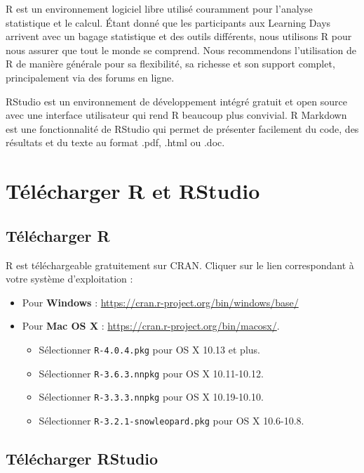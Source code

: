 \documentclass[
  12pt,
]{book}
\providecommand{\tightlist}{%
  \setlength{\itemsep}{0pt}\setlength{\parskip}{0pt}}
\begin{document}
R est un environnement logiciel libre utilisé couramment pour l'analyse statistique et le calcul. Étant donné que les participants aux Learning Days arrivent avec un bagage statistique et des outils différents, nous utilisons R pour nous assurer que tout le monde se comprend. Nous recommendons l'utilisation de R de manière générale pour sa flexibilité, sa richesse et son support complet, principalement via des forums en ligne.

RStudio est un environnement de développement intégré gratuit et open source avec une interface utilisateur qui rend R beaucoup plus convivial. R Markdown est une fonctionnalité de RStudio qui permet de présenter facilement du code, des résultats et du texte au format .pdf, .html ou .doc.

\hypertarget{tuxe9luxe9charger-r-et-rstudio}{%
\section{Télécharger R et RStudio}\label{tuxe9luxe9charger-r-et-rstudio}}

\hypertarget{tuxe9luxe9charger-r}{%
\subsection{Télécharger R}\label{tuxe9luxe9charger-r}}

R est téléchargeable gratuitement sur CRAN. Cliquer sur le lien correspondant à votre système d'exploitation :

\begin{itemize}
\tightlist
\item
  Pour \textbf{Windows} : \url{https://cran.r-project.org/bin/windows/base/}
\item
  Pour \textbf{Mac OS X} : \url{https://cran.r-project.org/bin/macosx/}.

  \begin{itemize}
  \tightlist
  \item
    Sélectionner \texttt{R-4.0.4.pkg} pour OS X 10.13 et plus.
  \item
    Sélectionner \texttt{R-3.6.3.nnpkg} pour OS X 10.11-10.12.
  \item
    Sélectionner \texttt{R-3.3.3.nnpkg} pour OS X 10.19-10.10.
  \item
    Sélectionner \texttt{R-3.2.1-snowleopard.pkg} pour OS X 10.6-10.8.
  \end{itemize}
\end{itemize}

\hypertarget{tuxe9luxe9charger-rstudio}{%
\subsection{Télécharger RStudio}\label{tuxe9luxe9charger-rstudio}}
\end{document}
